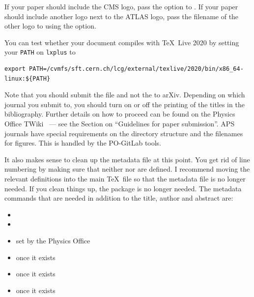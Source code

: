 If your paper should include the CMS logo, pass the option  to .
If your paper should include another logo next to the ATLAS logo,
pass the filename of the other logo to  using the  option.

You can test whether your document compiles with \TeX\ Live 2020 by setting your \texttt{PATH} on \texttt{lxplus} to
{\small
\begin{verbatim}
export PATH=/cvmfs/sft.cern.ch/lcg/external/texlive/2020/bin/x86_64-linux:${PATH}
\end{verbatim}
}

Note that you should submit the  file and not the  to arXiv.
Depending on which journal you submit to, you should turn on or off the printing of the titles in the bibliography.
Further details on how to proceed can be found on the Physics Office TWiki~\cite{atlas-physicsoffice} --- see
the Section on \enquote{Guidelines for paper submission}.
APS journals have special requirements on the directory structure and the filenames for figures.
This is handled by the PO-GitLab tools.

It also makes sense to clean up the metadata file at this point.
You get rid of line numbering by making sure that neither  nor  are defined.
I recommend moving the relevant definitions into the main \TeX\ file so that the metadata file is no longer needed.
If you clean things up, the  package is no longer needed.
The metadata commands that are needed in addition to the title, author and abstract are:
\begin{itemize}
  \item {}
  \item {}
  \item {} set by the Physics Office
  \item {} once it exists
  \item {} once it exists
  \item {} once it exists
\end{itemize}

